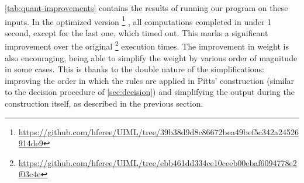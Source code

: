 \documentclass[english,review]{jflart}
\def\BaseUrlCode{https://github.com/hferee/UIML}
\def\CommitOrig{ebb461dd334ce10ceeb00ebaf6094778e2f03c4e} %
\def\CommitOpt{39b38d9d8c86672bea49bef5c342a24526914de9} %
\theoremstyle{definition}
\theoremstyle{plain}
\begin{document}
\cref{tab:quant-improvements} contains the results of running our program on these inputs. In the optimized version \footnote{\url{\BaseUrlCode/tree/\CommitOpt}} , all computations completed in under 1 second, except for the last one, which timed out.
This marks a significant improvement over the original \footnote{\url{\BaseUrlCode/tree/\CommitOrig}}
execution times. The improvement in weight is also encouraging, being able to simplify the weight by various order of magnitude in some cases. This is thanks to the double nature of the simplifications: improving the order in which the rules are applied in Pitts' construction (similar to the decision procedure of \cref{sec:decision}) and simplifying the output during the construction itself, as described in the previous section.



\newpage 


\end{document}
